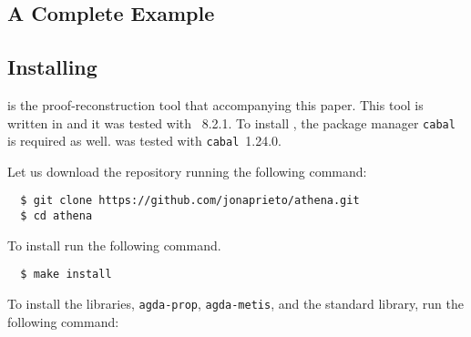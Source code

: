 \documentclass[../main.tex]{subfiles}
\begin{document}
\begin{subappendices}


\clearpage
\section{A Complete Example}
\label{app:complete-example}

\subsection{Installing \Athena}

\Athena is the proof-reconstruction tool that accompanying this paper.
This tool is written in \Haskell and it was tested with ~8.2.1.
To install \Athena, the package manager \verb!cabal! is required as well.
\Athena was tested with \verb!cabal!~1.24.0.

Let us download the \Athena repository running the following command:

\begin{verbatim}
  $ git clone https://github.com/jonaprieto/athena.git
  $ cd athena
\end{verbatim}

To install \Athena run the following command.

\begin{verbatim}
  $ make install
\end{verbatim}

To install the \Agda libraries, \verb!agda-prop!, \verb!agda-metis!, and
the \Agda standard library, run the following command:


\end{subappendices}
\end{document}
